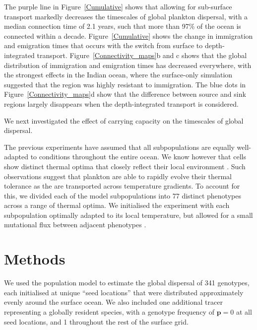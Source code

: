 \documentclass[12pt]{article}
\begin{document}
The purple line in Figure~\ref{Cumulative} shows that allowing for sub-surface transport markedly decreases the timescales of global plankton dispersal, with a median connection time of 2.1 years, such that more than 97\% of the ocean is connected within a decade. Figure~\ref{Cumulative} shows the change in immigration and emigration times that occurs with the switch from surface to depth-integrated transport. Figure~\ref{Connectivity_maps}b and c shows that the global distribution of immigration and emigration times has decreased everywhere, with the strongest effects in the Indian ocean, where the surface-only simulation suggested that the region was highly resistant to immigration. The blue dots in Figure~\ref{Connectivity_maps}d show that the difference between source and sink regions largely disappears when the depth-integrated transport is considered. 

We next investigated the effect of carrying capacity on the timescales of global dispersal. 



The previous experiments have assumed that all subpopulations are equally well-adapted to conditions throughout the entire ocean. We know however that cells show distinct thermal optima that closely reflect their local environment \citep{Thomas:2012}. Such observations suggest that plankton are able to rapidly evolve their thermal tolerance as the are transported across temperature gradients. To account for this, we divided each of the model subpopulations into 77 distinct phenotypes across a range of thermal optima. We initialised the experiment with each subpopulation optimally adapted to its local temperature, but allowed for a small mutational flux between adjacent phenotypes \citep{Beckman:2019}.








\section{Methods}


We used the population model to estimate the global dispersal of 341 genotypes, each initialised at unique ``seed locations'' that were distributed approximately evenly around the surface ocean. We also included one additional tracer representing a globally resident species, with a genotype frequency of $\mathbf{p} = 0$ at all seed locations, and 1 throughout the rest of the surface grid.
\end{document}
